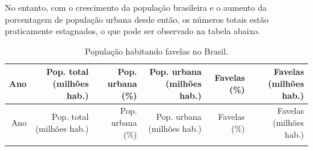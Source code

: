 \documentclass[
	12pt,				%
	oneside,			%
	a4paper,			%
	chapter=TITLE,		%
	section=TITLE,		%
	english,			%
	brazil				%
	]{abntex2}
\begin{document}
No entanto, com o crescimento da população brasileira e o aumento da porcentagem
de população urbana desde então, os números totais estão praticamente estagnados,
o que pode ser observado na tabela abaixo.
\begin{longtable}[]{@{}rrrrrr@{}}
\caption{População habitando favelas no Brasil.}\tabularnewline
\toprule
\begin{minipage}[b]{0.04\columnwidth}\raggedleft
Ano\strut
\end{minipage} & \begin{minipage}[b]{0.20\columnwidth}\raggedleft
Pop. total (milhões hab.)\strut
\end{minipage} & \begin{minipage}[b]{0.13\columnwidth}\raggedleft
Pop. urbana (\%)\strut
\end{minipage} & \begin{minipage}[b]{0.21\columnwidth}\raggedleft
Pop. urbana (milhões hab.)\strut
\end{minipage} & \begin{minipage}[b]{0.10\columnwidth}\raggedleft
Favelas (\%)\strut
\end{minipage} & \begin{minipage}[b]{0.17\columnwidth}\raggedleft
Favelas (milhões hab.)\strut
\end{minipage}\tabularnewline
\midrule
\endfirsthead
\toprule
\begin{minipage}[b]{0.04\columnwidth}\raggedleft
Ano\strut
\end{minipage} & \begin{minipage}[b]{0.20\columnwidth}\raggedleft
Pop. total (milhões hab.)\strut
\end{minipage} & \begin{minipage}[b]{0.13\columnwidth}\raggedleft
Pop. urbana (\%)\strut
\end{minipage} & \begin{minipage}[b]{0.21\columnwidth}\raggedleft
Pop. urbana (milhões hab.)\strut
\end{minipage} & \begin{minipage}[b]{0.10\columnwidth}\raggedleft
Favelas (\%)\strut
\end{minipage} & \begin{minipage}[b]{0.17\columnwidth}\raggedleft
Favelas (milhões hab.)\strut
\end{minipage}\tabularnewline
\midrule
\endhead
\begin{minipage}[t]{0.04\columnwidth}\raggedleft
1990\strut
\end{minipage} & \begin{minipage}[t]{0.20\columnwidth}\raggedleft

\end{minipage}
\end{longtable}
\end{document}
